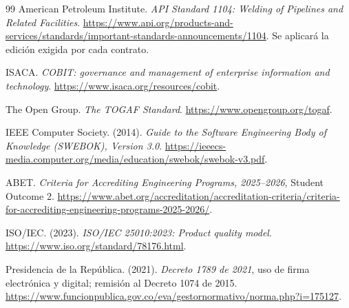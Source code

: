 \documentclass[12pt,letterpaper]{article}
\begin{document}
\begin{thebibliography}{99}
American Petroleum Institute. \emph{API Standard 1104: Welding of Pipelines and Related Facilities}.
\url{https://www.api.org/products-and-services/standards/important-standards-announcements/1104}.
Se aplicará la edición exigida por cada contrato.

ISACA. \emph{COBIT: governance and management of enterprise information and technology}.
\url{https://www.isaca.org/resources/cobit}.

The Open Group. \emph{The TOGAF Standard}.
\url{https://www.opengroup.org/togaf}.

IEEE Computer Society. (2014). \emph{Guide to the Software Engineering Body of Knowledge (SWEBOK), Version 3.0}.
\url{https://ieeecs-media.computer.org/media/education/swebok/swebok-v3.pdf}.

ABET. \emph{Criteria for Accrediting Engineering Programs, 2025--2026}, Student Outcome 2.
\url{https://www.abet.org/accreditation/accreditation-criteria/criteria-for-accrediting-engineering-programs-2025-2026/}.

ISO/IEC. (2023). \emph{ISO/IEC 25010:2023: Product quality model}.
\url{https://www.iso.org/standard/78176.html}.


Presidencia de la República. (2021). \emph{Decreto 1789 de 2021}, uso de firma electrónica y digital; remisión al Decreto 1074 de 2015.
\url{https://www.funcionpublica.gov.co/eva/gestornormativo/norma.php?i=175127}.

\end{thebibliography}
\end{document}
